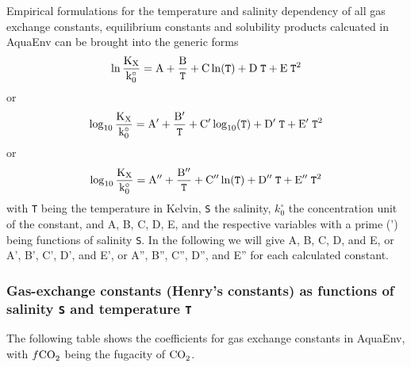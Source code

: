 \documentclass[a4paper]{article}
\begin{document}
Empirical formulations for the temperature and salinity dependency of all gas exchange constants, equilibrium constants and solubility products calcuated in \textsf{AquaEnv} can be brought into the generic forms
\begin{equation}
\rm \ln{\frac{K_X}{k_0^\circ}} = A + \frac{B}{\mbox{\texttt{T}}} + C \ln(\mbox{\texttt{T}}) + D \; \mbox{\texttt{T}} + E \;\mbox{\texttt{T}}^2
\end{equation}
or
\begin{equation}
\rm \log_{10}{\frac{K_X}{k_0^\circ}} = A' + \frac{B'}{\mbox{\texttt{T}}} + C' \log_{10}(\mbox{\texttt{T}}) + D' \; \mbox{\texttt{T}} + E' \;\mbox{\texttt{T}}^2
\end{equation}
or
\begin{equation}
\rm \log_{10}{\frac{K_X}{k_0^\circ}} = A'' + \frac{B''}{\mbox{\texttt{T}}} + C'' \ln(\mbox{\texttt{T}}) + D'' \; \mbox{\texttt{T}} + E'' \;\mbox{\texttt{T}}^2 \label{eq: logk}
\end{equation}
with \texttt{T} being the temperature in Kelvin, \texttt{S} the salinity, $k_0^\circ$ the concentration unit of the constant, and A, B, C, D, E, and the respective variables with a prime (') being functions of salinity \texttt{S}.
In the following we will give A, B, C, D, and E,  or A', B', C', D', and E', or A'', B'', C'', D'', and E'' for each calculated constant.

\subsubsection{Gas-exchange constants (Henry's constants) as functions of salinity \texttt{S} and temperature \texttt{T}}

The following table shows the coefficients for gas exchange constants in \textsf{AquaEnv}, with $f\ce{CO_2}$ being the fugacity of $\ce{CO_2}$.

\clearpage
\end{document}
